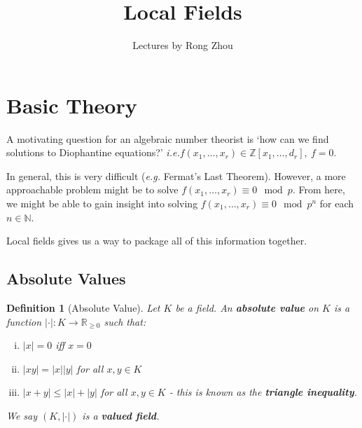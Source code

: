 \documentclass[]{article}
\title{Local Fields}
\author{Lectures by Rong Zhou}
\date{}
\theoremstyle{custhm}
\theoremstyle{cusdef}
\newtheorem{defin}[theorem]{Definition}
\theoremstyle{custhm}
\theoremstyle{custhm}
\theoremstyle{custhm}
\theoremstyle{custhm}
\theoremstyle{cusdef}
\theoremstyle{remark}
\newcommand{\N}{\mathbb{N}}
\newcommand{\Z}{\mathbb{Z}}
\newcommand{\R}{\mathbb{R}}
\newcommand{\ra}{\rightarrow}
\newcommand{\ie}{\textit{i.e.}}
\newcommand{\undf}[1]{\textit{\textbf{#1}}}
\renewcommand{\it}[1]{\textit{#1}}
\begin{document}
\maketitle
\clearpage
\tableofcontents
\clearpage

\section{Basic Theory}

A motivating question for an algebraic number theorist is `how can we find solutions to Diophantine equations?' \ie $f(x_1,\dots,x_r)\in \Z[x_1,\dots,d_r],\ f = 0$.

In general, this is very difficult (\it{e.g.} Fermat's Last Theorem). However, a more approachable problem might be to solve $f(x_1,\dots,x_r)\equiv 0 \mod p$. From here, we might be able to gain insight into solving $f(x_1,\dots,x_r)\equiv 0\mod p^n$ for each $n\in\N$.

Local fields gives us a way to package all of this information together.

\subsection{Absolute Values}

\begin{defin}[Absolute Value]
	Let $K$ be a field. An \undf{absolute value} on $K$ is a function $|\cdot|:K\ra\R_{\ge0}$ such that:
	\begin{enumerate}[(i)]
		\item $|x| = 0$ iff $x= 0$
		\item $|xy| = |x||y|$ for all $x,y\in K$
		\item $|x+y| \le |x| + |y|$ for all $x,y\in K$ - this is known as the \undf{triangle inequality}.
	\end{enumerate}

We say $(K,|\cdot|)$ is a \undf{valued field}.
\end{defin}
\end{document}
